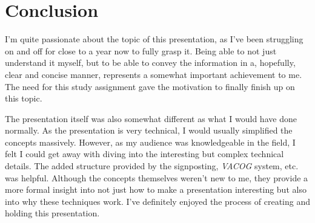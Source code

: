 \chapter{Conclusion}



I'm quite passionate about the topic of this presentation, as I've been struggling on and off for close to a year now to fully grasp it.
Being able to not just understand it myself, but to be able to convey the information in a, hopefully, clear and concise manner, represents a somewhat important achievement to me.
The need for this study assignment gave the motivation to finally finish up on this topic.

The presentation itself was also somewhat different as what I would have done normally.
As the presentation is very technical, I would usually simplified the concepts massively.
However, as my audience was knowledgeable in the field, I felt I could get away with diving into the interesting but complex technical details.
The added structure provided by the signposting, \textit{VACOG} system, etc. was helpful.
Although the concepts themselves weren't new to me, they provide a more formal insight into not just how to make a presentation interesting but also into why these techniques work.
I've definitely enjoyed the process of creating and holding this presentation.

\asterism
